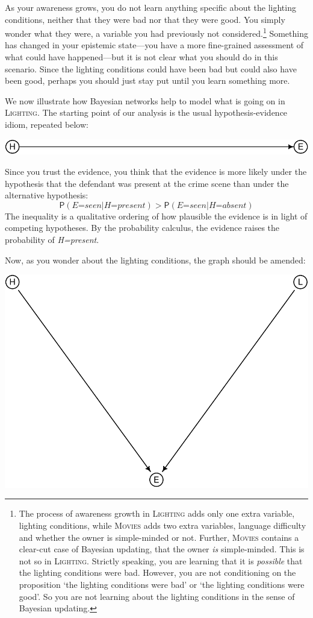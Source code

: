 \documentclass[
  11pt,
  dvipsnames,enabledeprecatedfontcommands, todos]{scrartcl}
\newcommand{\pr}[1]{\ensuremath{\mathsf{P}(#1)}}
\begin{document}
As your awareness grows, you do not learn anything specific about the
lighting conditions, neither that they were bad nor that they were good.
You simply wonder what they were, a variable you had previously not
considered.\footnote{The process of awareness growth in
  \textsc{Lighting} adds only one extra variable, lighting conditions,
  while \textsc{Movies} adds two extra variables, language difficulty
  and whether the owner is simple-minded or not. Further,
  \textsc{Movies} contains a clear-cut case of Bayesian updating, that
  the owner \emph{is} simple-minded. This is not so in
  \textsc{Lighting}. Strictly speaking, you are learning that it is
  \emph{possible} that the lighting conditions were bad. However, you
  are not conditioning on the proposition `the lighting conditions were
  bad' or `the lighting conditions were good'. So you are not learning
  about the lighting conditions in the sense of Bayesian updating.}
Something has changed in your epistemic state---you have a more
fine-grained assessment of what could have happened---but it is not
clear what you should do in this scenario. Since the lighting conditions
could have been bad but could also have been good, perhaps you should
just stay put until you learn something more.

We now illustrate how Bayesian networks help to model what is going on
in \textsc{Lighting}. The starting point of our analysis is the usual
hypothesis-evidence idiom, repeated below:

\begin{center}\includegraphics[width=0.5\linewidth,height=0.5\textheight]{ReplyToSteeleStefansson5_files/figure-latex/heDAG-1} \end{center}

\noindent Since you trust the evidence, you think that the evidence is
more likely under the hypothesis that the defendant was present at the
crime scene than under the alternative hypothesis:
\[\pr{\textit{E=seen} \vert \textit{H=present}} > \pr{\textit{E=seen} \vert \textit{H=absent}}\]
The inequality is a qualitative ordering of how plausible the evidence
is in light of competing hypotheses. By the probability calculus, the
evidence raises the probability of \textit{H=present}.

Now, as you wonder about the lighting conditions, the graph should be
amended:

\begin{center}\includegraphics[width=0.5\linewidth,height=0.3\textheight]{ReplyToSteeleStefansson5_files/figure-latex/lighting2DAG-1} \end{center}
\end{document}
